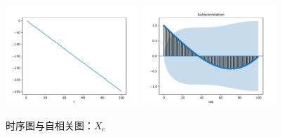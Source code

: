 \documentclass[cn]{homework}
\begin{document}
\begin{subproblem}
        \item
        \begin{figure}[h]
            \centering
            \includegraphics[width=0.45\textwidth]{hw2/Xe.pdf}
            \includegraphics[width=0.45\textwidth]{hw2/Xe-acf.pdf}
            \caption{时序图与自相关图：$X_e$}
        \end{figure}
    \end{subproblem}

    \newpage
\end{document}
